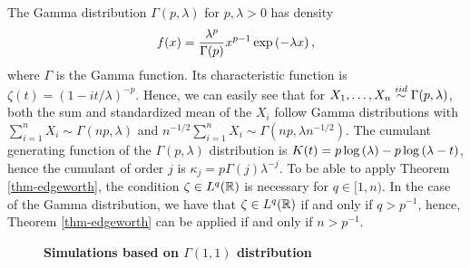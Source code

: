 \begin{example}
    The Gamma distribution $\Gamma(p, \lambda)$ for $p, \lambda > 0$ has density
    \begin{equation*}
        f(x) = \frac{\lambda^p}{\Gamma(p)} x^{p-1} \exp\left(-\lambda x\right),
    \end{equation*}
    where $\Gamma$ is the Gamma function. Its characteristic function is $\zeta(t) = (1 - it/\lambda)^{-p}$. Hence, we can easily see that for $X_1, \ldots, X_n \stackrel{iid}{\sim} \Gamma(p, \lambda)$, both the sum and standardized mean of the $X_i$ follow Gamma distributions with $\sum_{i=1}^n X_i \sim \Gamma(np, \lambda)$ and $n^{-1/2} \sum_{i=1}^n X_i \sim \Gamma(np, \lambda n^{-1/2})$. The cumulant generating function of the $\Gamma(p, \lambda)$ distribution is $K(t) = p \log\left(\lambda\right) - p\log\left(\lambda - t\right)$, hence the cumulant of order $j$ is $\kappa_j = p\Gamma(j)\lambda^{-j}$. To be able to apply Theorem \ref{thm-edgeworth}, the condition $\zeta \in L^q(\mathbb{R})$ is necessary for $q \in [1, n)$. In the case of the Gamma distribution, we have that $\zeta \in L^q(\mathbb{R})$ if and only if $q > p^{-1}$, hence, Theorem \ref{thm-edgeworth} can be applied if and only if $n > p^{-1}$.

    \begin{figure}[h]
        \textbf{Simulations based on $\Gamma(1,1)$ distribution}
        \centering
        \qquad
    \end{figure}
    
\end{example}
